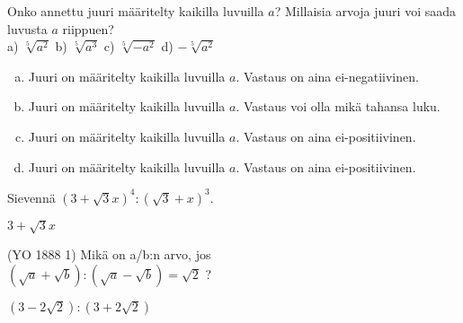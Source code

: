 \begin{tehtava}
Onko annettu juuri määritelty kaikilla luvuilla $a$? Millaisia arvoja juuri voi saada luvusta $a$ riippuen?\\
a) $\sqrt[5]{a^2}$ \quad b) $\sqrt[5]{a^3}$ \quad c) $\sqrt[5]{-a^2}$ \quad d) $- \sqrt[5]{a^2}$

\begin{vastaus}

\begin{enumerate}[a)]
	\item Juuri on määritelty kaikilla luvuilla $a$. Vastaus on aina ei-negatiivinen.
	\item Juuri on määritelty kaikilla luvuilla $a$. Vastaus voi olla mikä tahansa luku.
	\item Juuri on määritelty kaikilla luvuilla $a$. Vastaus on aina ei-positiivinen.
	\item Juuri on määritelty kaikilla luvuilla $a$. Vastaus on aina ei-positiivinen.
\end{enumerate}
\end{vastaus}
\end{tehtava}

\begin{tehtava}
Sievennä $(3+\sqrt{3}x)^4:(\sqrt{3}+x)^3$.
\begin{vastaus}
$3 + \sqrt{3}x$
\end{vastaus}
\end{tehtava}

\begin{tehtava}
(YO 1888 1) Mikä on a/b:n arvo, jos \\
$ (\sqrt{a}+\sqrt{b}):(\sqrt{a}-\sqrt{b})=\sqrt{2}$ ?
\begin{vastaus}
$(3-2\sqrt{2}):(3+2\sqrt{2})$
\end{vastaus}
\end{tehtava}

